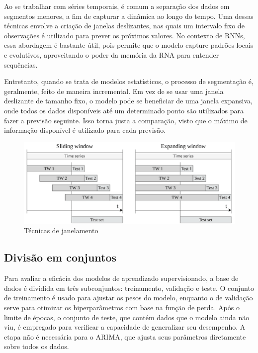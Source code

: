 Ao se trabalhar com séries temporais, é comum a separação dos dados em segmentos menores,
 a fim de capturar a dinâmica ao longo do tempo.
Uma dessas técnicas envolve a criação de janelas deslizantes, nas quais um intervalo fixo de observações é utilizado para prever os próximos valores.
No contexto de RNNs, essa abordagem é bastante útil, pois permite que o modelo capture padrões locais e evolutivos, aproveitando o poder da memória da RNA para entender sequências.

Entretanto, quando se trata de modelos estatísticos, o processo de segmentação é, geralmente, feito de maneira incremental.
Em vez de se usar uma janela deslizante de tamanho fixo, o modelo pode se beneficiar de uma janela expansiva, onde todos os dados disponíveis até um determinado ponto são utilizados para fazer a previsão seguinte.
Isso torna justa a comparação, visto que o máximo de informação disponível é utilizado para cada previsão.

\begin{figure}[!htb] \centering
    \caption{Técnicas de janelamento} \label{figura:window}
    \begin{varwidth}{\linewidth}
      \includegraphics[width=12cm]{figuras/window.png}
    \end{varwidth}
\end{figure}
  

\subsection{Divisão em conjuntos} \label{sec:divisao}
Para avaliar a eficácia dos modelos de aprendizado supervisionado, a base de dados é dividida em três subconjuntos: treinamento, validação e teste.
O conjunto de treinamento é usado para ajustar os pesos do modelo, enquanto o de validação serve para otimizar os hiperparâmetros com base na função de perda.
Após o limite de épocas, o conjunto de teste, que contém dados que o modelo ainda não viu, é empregado para verificar a capacidade de generalizar seu desempenho. A etapa não é necessária para o ARIMA, que ajusta seus parâmetros diretamente sobre todos os dados.

